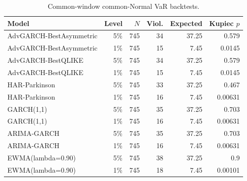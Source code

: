 \begin{table}[!t]
\centering
\caption{Common-window common-Normal VaR backtests.}
\label{tab:common-window-var-backtests}
\scriptsize
\begin{tabular}{@{}L{0.38\columnwidth}rrrrr@{}}
\toprule
Model & Level & \(N\) & Viol. & Expected & Kupiec \(p\) \\
\midrule
AdvGARCH-BestAsymmetric & 5\% & 745 & 34 & 37.25 & 0.579 \\
AdvGARCH-BestAsymmetric & 1\% & 745 & 15 & 7.45 & 0.0145 \\
AdvGARCH-BestQLIKE & 5\% & 745 & 34 & 37.25 & 0.579 \\
AdvGARCH-BestQLIKE & 1\% & 745 & 15 & 7.45 & 0.0145 \\
HAR-Parkinson & 5\% & 745 & 33 & 37.25 & 0.467 \\
HAR-Parkinson & 1\% & 745 & 16 & 7.45 & 0.00631 \\
GARCH(1,1) & 5\% & 745 & 35 & 37.25 & 0.703 \\
GARCH(1,1) & 1\% & 745 & 16 & 7.45 & 0.00631 \\
ARIMA-GARCH & 5\% & 745 & 35 & 37.25 & 0.703 \\
ARIMA-GARCH & 1\% & 745 & 16 & 7.45 & 0.00631 \\
EWMA(lambda=0.90) & 5\% & 745 & 38 & 37.25 & 0.9 \\
EWMA(lambda=0.90) & 1\% & 745 & 18 & 7.45 & 0.00101 \\
\bottomrule
\end{tabular}
\end{table}
